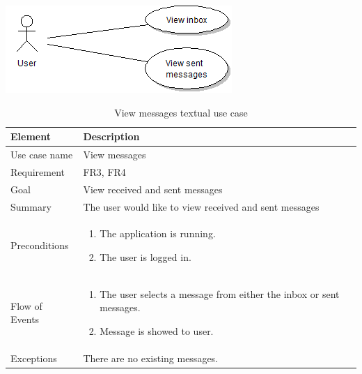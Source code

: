 \begin{table}
\begin{center}
\begin{center}
\includegraphics[width=\textwidth]{view_messages}
\end{center}
\begin{tabular}{p{3cm}|p{12cm}}\hline
\textbf{Element} & \textbf{Description} \\ \hline \hline
Use case name & View messages \\
Requirement & FR3, FR4 \\
Goal & View received and sent messages \\
Summary &The user would like to view received and sent messages \\
Preconditions &
\begin{enumerate}
\item{}The application is running.
\item{}The user is logged in.
\end{enumerate} \\ \hline
Flow of Events &
\begin{enumerate}
\item{}The user selects a message from either the inbox or sent messages.
\item{}Message is showed to user.
\end{enumerate} \\ \hline
Exceptions & There are no existing messages.\\ \hline
\end{tabular}
\end{center}
\caption{View messages textual use case} \label{tab:viewmessages}
\end{table}

